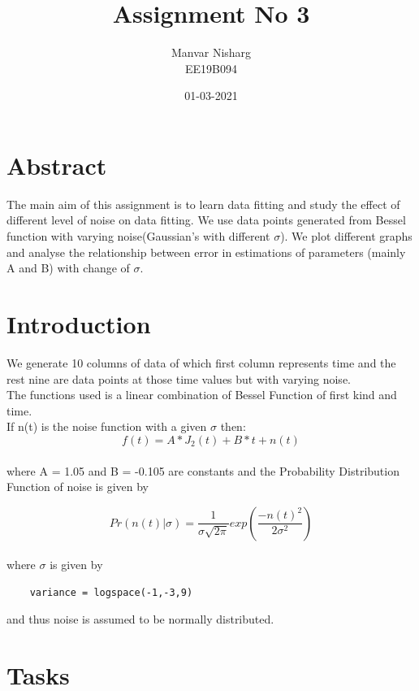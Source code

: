 \documentclass[11pt, a4paper]{article}
\title{Assignment No 3} %
\author{Manvar Nisharg \\ {\small EE19B094}}
\date{01-03-2021} %
\begin{document}
		
		
\maketitle %
\section{Abstract}
\par The main aim of this assignment is to learn data fitting and study the effect of different level of noise on data fitting. We use data points generated from Bessel function with varying noise(Gaussian's with different $\sigma$). We plot different graphs and analyse the relationship between error in estimations of parameters (mainly A and B) with change of $\sigma$.\\

\section{Introduction}
We generate 10 columns of data of which first column represents time and the rest nine are data points at those time values but with varying noise.\\

The functions used is a linear combination of Bessel Function of first kind and time.\\If n(t) is the noise function with a given $\sigma$ then:\\
\begin{equation*}
f(t) = A*J_{2}(t) + B*t + n(t)
\end{equation*}
\\
where A = 1.05 and B = -0.105 are constants and the Probability Distribution Function of noise is given by

 \begin{equation*}
Pr(n(t)|\sigma) = \frac{1}{\sigma\sqrt{2\pi}}exp(\frac{-n(t)^2}{2\sigma^2})
\end{equation*}
\\where $\sigma$ is given by 
\begin{verbatim}
    variance = logspace(-1,-3,9)
\end{verbatim}
and thus noise is assumed to be normally distributed.\\


\section{Tasks}
\end{document}

